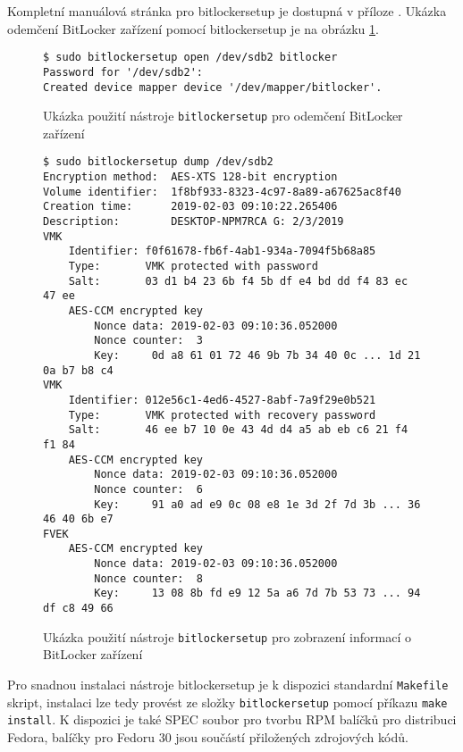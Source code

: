 Kompletní manuálová stránka pro bitlockersetup je dostupná v příloze . Ukázka odemčení BitLocker zařízení pomocí bitlockersetup je na obrázku \ref{fig:bitlockersetup-open}.

\begin{figure}[h]
		\centering
		\captionsetup{width=0.65\linewidth}
\begin{lstlisting}[frame=none, basicstyle=\ttfamily\small, columns=fullflexible, keepspaces=true]
$ sudo bitlockersetup open /dev/sdb2 bitlocker
Password for '/dev/sdb2': 
Created device mapper device '/dev/mapper/bitlocker'.

\end{lstlisting}
		\caption{Ukázka použití nástroje \texttt{bitlockersetup} pro odemčení BitLocker zařízení}
		\label{fig:bitlockersetup-open}
\end{figure}

\begin{figure}[h]
		\centering
		\captionsetup{width=0.65\linewidth}
\begin{lstlisting}[frame=none, basicstyle=\ttfamily\small, columns=fullflexible, keepspaces=true]
$ sudo bitlockersetup dump /dev/sdb2
Encryption method:	AES-XTS 128-bit encryption
Volume identifier:	1f8bf933-8323-4c97-8a89-a67625ac8f40
Creation time:		2019-02-03 09:10:22.265406
Description:		DESKTOP-NPM7RCA G: 2/3/2019
VMK
	Identifier:	f0f61678-fb6f-4ab1-934a-7094f5b68a85
	Type:		VMK protected with password
	Salt:		03 d1 b4 23 6b f4 5b df e4 bd dd f4 83 ec 47 ee
	AES-CCM encrypted key
		Nonce data:	2019-02-03 09:10:36.052000
		Nonce counter:	3
		Key:	 0d a8 61 01 72 46 9b 7b 34 40 0c ... 1d 21 0a b7 b8 c4
VMK
	Identifier:	012e56c1-4ed6-4527-8abf-7a9f29e0b521
	Type:		VMK protected with recovery password
	Salt:		46 ee b7 10 0e 43 4d d4 a5 ab eb c6 21 f4 f1 84
	AES-CCM encrypted key
		Nonce data:	2019-02-03 09:10:36.052000
		Nonce counter:	6
		Key:	 91 a0 ad e9 0c 08 e8 1e 3d 2f 7d 3b ... 36 46 40 6b e7
FVEK
	AES-CCM encrypted key
		Nonce data:	2019-02-03 09:10:36.052000
		Nonce counter:	8
		Key:	 13 08 8b fd e9 12 5a a6 7d 7b 53 73 ... 94 df c8 49 66

\end{lstlisting}
		\caption{Ukázka použití nástroje \texttt{bitlockersetup} pro zobrazení informací o BitLocker zařízení}
		\label{fig:bitlockersetup-dump}
\end{figure}


Pro snadnou instalaci nástroje bitlockersetup je k dispozici standardní \texttt{Makefile} skript, instalaci lze tedy provést ze složky \texttt{bitlockersetup} pomocí příkazu \texttt{make install}. K dispozici je také SPEC soubor pro tvorbu RPM balíčků pro distribuci Fedora, balíčky pro Fedoru 30 jsou součástí přiložených zdrojových kódů.

